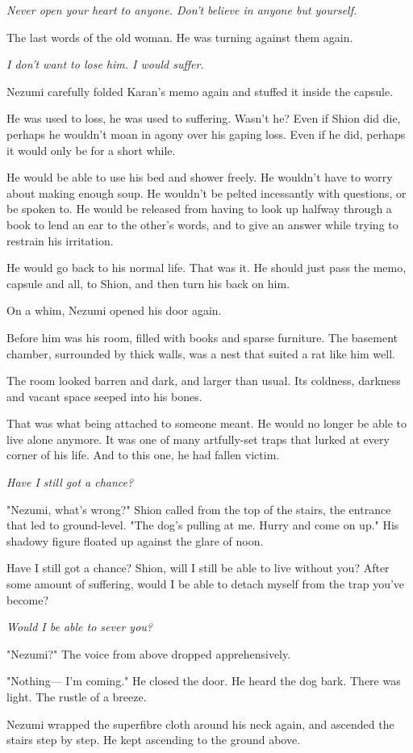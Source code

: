\emph{Never open your heart to anyone. Don't believe in anyone but yourself.}

The last words of the old woman. He was turning against them again.

\emph{I don't want to lose him. I would suffer.}

Nezumi carefully folded Karan's memo again and stuffed it inside the
capsule.

He was used to loss, he was used to suffering. Wasn't he? Even if Shion
did die, perhaps he wouldn't moan in agony over his gaping loss. Even if
he did, perhaps it would only be for a short while.

He would be able to use his bed and shower freely. He wouldn't have to
worry about making enough soup. He wouldn't be pelted incessantly with
questions, or be spoken to. He would be released from having to look up
halfway through a book to lend an ear to the other's words, and to give
an answer while trying to restrain his irritation.

He would go back to his normal life. That was it. He should just pass
the memo, capsule and all, to Shion, and then turn his back on him.

On a whim, Nezumi opened his door again.

Before him was his room, filled with books and sparse furniture. The
basement chamber, surrounded by thick walls, was a nest that suited a
rat like him well.

The room looked barren and dark, and larger than usual. Its coldness,
darkness and vacant space seeped into his bones.

That was what being attached to someone meant. He would no longer be
able to live alone anymore. It was one of many artfully-set traps that
lurked at every corner of his life. And to this one, he had fallen
victim.

\emph{Have I still got a chance?}

"Nezumi, what's wrong?" Shion called from the top of the stairs, the
entrance that led to ground-level. "The dog's pulling at me. Hurry and
come on up." His shadowy figure floated up against the glare of noon.

Have I still got a chance? Shion, will I still be able to live without
you? After some amount of suffering, would I be able to detach myself
from the trap you've become?

\emph{Would I be able to sever you?}

"Nezumi?" The voice from above dropped apprehensively.

"Nothing--- I'm coming." He closed the door. He heard the dog bark. There
was light. The rustle of a breeze.

Nezumi wrapped the superfibre cloth around his neck again, and ascended
the stairs step by step. He kept ascending to the ground above.